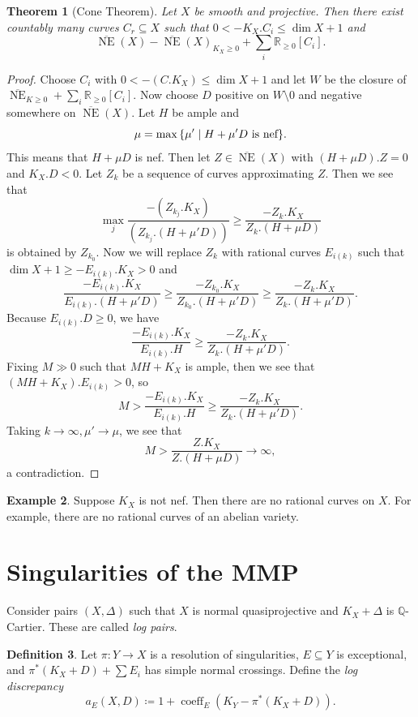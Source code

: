 \documentclass[leqno, openany]{memoir}
\newtheorem{thm}{Theorem}[section]
\theoremstyle{definition}
\newtheorem{defn}[thm]{Definition}
\newtheorem{exm}[thm]{Example}
\theoremstyle{remark}
\theoremstyle{plain}
\theoremstyle{definition}
\theoremstyle{remark}
\newcommand{\R}{\mathbb{R}}
\newcommand{\Q}{\mathbb{Q}}
\newcommand{\ol}[1]{\overline{#1}}
\DeclareMathOperator{\NE}{NE}
\begin{document}
\begin{thm}[Cone Theorem]
    Let $X$ be smooth and projective. Then there exist countably many curves $C_r \subseteq X$ such that $0 < - K_X.C_i \leq \dim X + 1$ and 
    \[ \ol{\NE}(X) - {\ol{\NE}(X)}_{K_X \geq 0} + \sum_i \R_{\geq 0} [C_i]. \]
\end{thm}

\begin{proof}
    Choose $C_i$ with $0 < -(C.K_X) \leq \dim X + 1$ and let $W$ be the closure of $\ol{\NE}_{K \geq 0} + \sum_i \R_{\geq 0} [C_i]$. Now choose $D$ positive on $W \setminus \qty{0}$ and negative somewhere on $\ol{\NE}(X)$. Let $H$ be ample and 
    \[ \mu = \max \qty{\mu' \mid H + \mu' D\ \text{is nef}}. \] 
    This means that $H + \mu D$ is nef. Then let $Z \in \ol{\NE}(X)$ with $(H+\mu D).Z = 0$ and $K_X.D < 0$. Let $Z_k$ be a sequence of curves approximating $Z$. Then we see that
    \[ \max_j \frac{- (Z_{k_j}. K_X)}{(Z_{k_j}.(H + \mu'D))} \geq \frac{-Z_k.K_X}{Z_k.(H+\mu D)} \]
    is obtained by $Z_{k_0}$. Now we will replace $Z_k$ with rational curves $E_{i(k)}$ such that $\dim X + 1 \geq - E_{i(k)}.K_X > 0$ and 
    \[ \frac{-E_{i(k)}.K_X}{E_{i(k)}.(H + \mu' D)} \geq \frac{-Z_{k_0}.K_X}{Z_{k_0}.(H+\mu'D)} \geq \frac{-Z_k.K_X}{Z_k.(H+\mu'D)}. \]
    Because $E_{i(k)}.D \geq 0$, we have
    \[ \frac{-E_{i(k)}.K_X}{E_{i(k)}.H} \geq \frac{-Z_k.K_X}{Z_k.(H+\mu'D)}. \]
    Fixing $M \gg 0$ such that $MH + K_X$ is ample, then we see that $(MH + K_X).E_{i(k)} > 0$, so
    \[ M > \frac{- E_{i(k)}.K_X}{E_{i(k)}.H} \geq \frac{-Z_k.K_X}{Z_k.(H+\mu'D)}. \]
    Taking $k \to \infty, \mu' \to \mu$, we see that
    \[ M > \frac{Z.K_X}{Z.(H+\mu D)} \longrightarrow \infty, \]
    a contradiction.
\end{proof}

\begin{exm}
    Suppose $K_X$ is not nef. Then there are no rational curves on $X$. For example, there are no rational curves of an abelian variety.
\end{exm}

\section{Singularities of the MMP}%
\label{sec:singularities_of_the_mmp}

Consider pairs $(X, \Delta)$ such that $X$ is normal quasiprojective and $K_X + \Delta$ is $\Q$-Cartier. These are called \textit{log pairs}. 

\begin{defn}
    Let $\pi \colon Y \to X$ is a resolution of singularities, $E \subseteq Y$ is exceptional, and $\pi^* (K_X + D) + \sum E_i$ has simple normal crossings. Define the \textit{log discrepancy} 
    \[ a_E(X, D) \coloneqq 1 + \operatorname{coeff}_E (K_Y - \pi^* (K_X + D)). \]
\end{defn}
\end{document}
